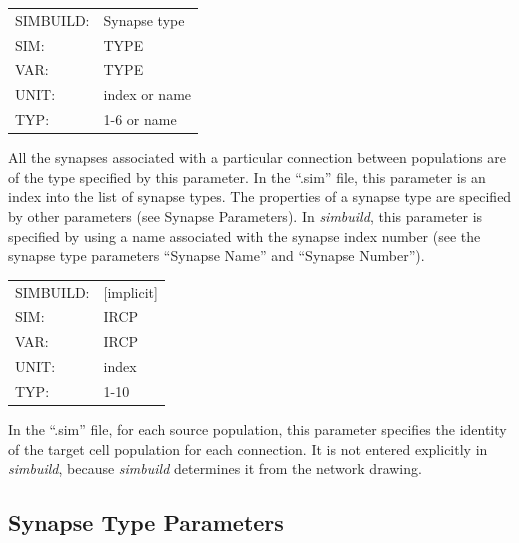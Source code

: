 \documentclass[12pt,openany,oneside]{book}
\newcommand{\prog}[1]{\textit{{#1}}}
\newcommand{\ext}[1]{{{``.#1''}}}
\newcommand{\inquotes}[1]{{{``#1''}}}
\begin{document}
\begin{flushleft}
\begin{tabular}{@{}ll@{}}
SIMBUILD: & Synapse type\\
SIM: & TYPE\\
VAR: & TYPE\\
UNIT: & index or name\\
TYP: & 1-6 or name\\
\end{tabular}
\end{flushleft}
\noindent
All the synapses associated with a particular connection between
populations are of the type specified by this parameter. In the
\ext{sim} file, this parameter is an index into the list of synapse
types. The properties of a synapse type are specified by other
parameters (see Synapse Parameters). In \prog{simbuild}, this parameter is
specified by using a name associated with the synapse index number
(see the synapse type parameters \inquotes{Synapse Name} and \inquotes{Synapse
Number}).
\filbreak
\vspace{\baselineskip}

\begin{flushleft}
\begin{tabular}{@{}ll@{}}
SIMBUILD: & [implicit]\\
SIM: & IRCP\\
VAR: & IRCP\\
UNIT: & index\\
TYP: & 1-10\\
\end{tabular}
\end{flushleft}
\noindent
In the \ext{sim} file, for each source population, this parameter
specifies the identity of the target cell population for each
connection. It is not entered explicitly in \prog{simbuild}, because \prog{simbuild}
determines it from the network drawing.
\filbreak
\vspace{\baselineskip}

\subsection{Synapse Type Parameters}
\label{Synapse Type Parameters}
\end{document}
